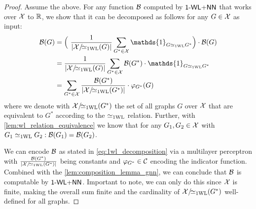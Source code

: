 \begin{proof}
    Assume the above. For any function $\mathcal{B}$ computed by $\textsf{1-WL+NN}$ that works over $\mathcal{X}$ to $\mathbb{R}$, we show that it can be decomposed as follows for any $G \in \mathcal{X}$ as input:
    \begin{align}\label{eq:1wl_decomposition}
        \cB(G) &= \Bigl( \ \frac{1}{|\cX/\!{\wliso}(G)|}\sum_{G^* \in \cX} \mathds{1}_{G \wliso G^*} \Bigr) \cdot \cB(G) \nonumber \\
        &= \frac{1}{|\cX/\!{\wliso}(G)|}\sum_{G^* \in \cX} \cB(G^*) \cdot \mathds{1}_{G \wliso G^*} \nonumber \\
        &= \sum_{G^* \in \cX} \frac{\cB(G^*)}{|\cX/\!{\wliso}(G^*)|}  \cdot \varphi_{G^*}(G)
    \end{align}
    where we denote with $\mathcal{X}/\!{\simeq_{\text{1WL}}}(G^*)$ the set of all graphs $G$ over $\mathcal{X}$ that are equivalent to $G^*$ according to the $\simeq_{\text{1WL}}$ relation. Further, with \cref{lem:wl_relation_equivalence} we know that for any $G_1, G_2 \in \mathcal{X}$ with $G_1 \simeq_{\text{1WL}} G_2: \mathcal{B}(G_1) = \mathcal{B}(G_2)$.
    
    We can encode $\mathcal{B}$ as stated in \autoref{eq:1wl_decomposition} via a multilayer perceptron with $\frac{\mathcal{B}(G^*)}{|\mathcal{X}/\!{\simeq_{\text{1WL}}}(G^*)|}$ being constants and $\varphi_{G^*} \in \mathcal{C}$ encoding the indicator function. Combined with the \autoref{lem:composition_lemma_gnn}, we can conclude that $\mathcal{B}$ is computable by $\textsf{1-WL+NN}$. Important to note, we can only do this since $\mathcal{X}$ is finite, making the overall sum finite and the cardinality of $\mathcal{X}/\!{\simeq_{\text{1WL}}}(G^*)$ well-defined for all graphs.
\end{proof}